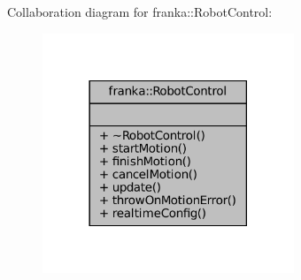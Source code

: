 Collaboration diagram for franka\+:\+:Robot\+Control\+:
\nopagebreak
\begin{figure}[H]
\begin{center}
\leavevmode
\includegraphics[width=213pt]{classfranka_1_1RobotControl__coll__graph}
\end{center}
\end{figure}
